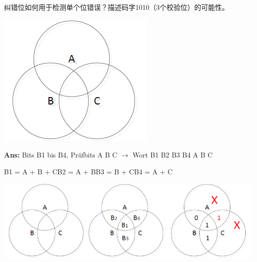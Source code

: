 \documentclass[fleqn]{article}
\begin{document}
纠错位如何用于检测单个位错误？描述码字1010（3个校验位）的可能性。

\begin{center}
    \includegraphics[scale=0.6]{4.png}
\end{center}

\textbf{Ans:} Bits B1 bis B4, Prüfbits A B C $\rightarrow$ Wort B1 B2 B3 B4 A B C

\qquad \qquad B1 = A + B + C\qquad B2 = A + B\qquad  B3 = B + C\qquad B4 = A + C

\begin{center}
    \includegraphics[scale=0.5]{5.png}
\end{center}
\end{document}
